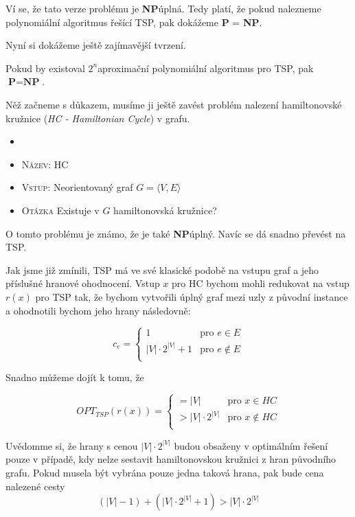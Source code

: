 \documentclass[
  biblatex,
  figures=false,
  glossaries,
  index
]{kidiplom}
\begin{document}
Ví se, že tato verze problému je \textbf{NP}\textendash úplná. Tedy platí, že pokud nalezneme polynomiální algoritmus řešící TSP, pak dokážeme \textbf{P} = \textbf{NP}.

Nyní si dokážeme ještě zajímavější tvrzení.
\begin{theorem}
Pokud by existoval $2^n$\textendash aproximační polynomiální algoritmus pro TSP, pak~$\textbf{P} = \textbf{NP}$.
\end{theorem}

Něž začneme s důkazem, musíme ji ještě zavést problém nalezení hamiltonovské kružnice (\textit{HC - Hamiltonian Cycle}) v grafu.
\begin{definition}
\begin{itemize}[label={}]
  \item
  \item \textsc{Název}: HC
  \item \textsc{Vstup}: Neorientovaný graf $G=\langle V, E \rangle$
  \item \textsc{Otázka} Existuje v $G$ hamiltonovská kružnice?
\end{itemize}
\end{definition}

O tomto problému je známo, že je také \textbf{NP}\textendash úplný. Navíc se dá snadno převést na TSP.

Jak jsme již zmínili, TSP má ve své klasické podobě na vstupu graf a jeho příslušné hranové ohodnocení. Vstup $x$ pro HC bychom mohli redukovat na vstup $r(x)$ pro TSP tak, že bychom vytvořili úplný graf mezi uzly z původní instance a ohodnotili bychom jeho hrany následovně:

$$c_e = \begin{cases}
1  & \text{pro } e \in E\\
|V|\cdot2^{|V|} + 1 & \text{pro } e \not\in E\\
\end{cases}$$

Snadno můžeme dojít k tomu, že

$$OPT_{TSP}(r(x)) = \begin{cases}
= |V|  & \text{pro } x \in HC\\
> |V|\cdot2^{|V|} & \text{pro } x \not\in HC\\
\end{cases}$$

Uvědomme si, že hrany s cenou $|V|\cdot2^{|V|}$ budou obsaženy v optimálním řešení pouze v případě, kdy nelze sestavit hamiltonovskou kružnici z hran původního grafu. Pokud musela být vybrána pouze jedna taková hrana, pak bude cena nalezené cesty $$(|V| - 1) + (|V|\cdot2^{|V|} + 1) > |V|\cdot2^{|V|}$$
\end{document}
